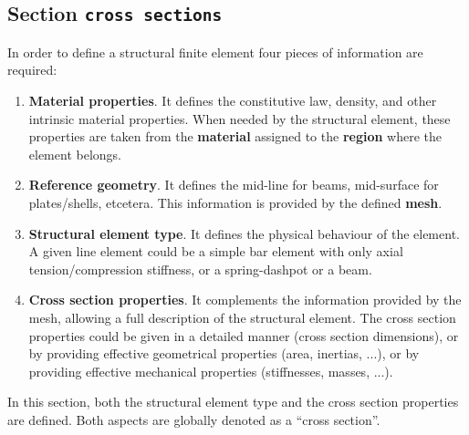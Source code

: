 \documentclass[a4paper,fleqn]{book}
\begin{document}
\subsection{Section \texttt{cross sections}}
\label{sec:cross_sections}
\label{subsec:cross_sections}

In order to define a structural finite element four pieces of information are required:
\begin{enumerate}

  \item \textbf{Material properties}. It defines the constitutive law, density, and other intrinsic material properties. When needed by the structural element, these properties are taken from the \textbf{material} assigned to the \textbf{region} where the element belongs.

  \item \textbf{Reference geometry}. It defines the mid-line for beams, mid-surface for plates/shells, etcetera. This information is provided by the defined \textbf{mesh}.
  
  \item \textbf{Structural element type}. It defines the physical behaviour of the element. A given line element could be a simple bar element with only axial tension/compression stiffness, or a spring-dashpot or a beam.
  
  \item \textbf{Cross section properties}. It complements the information provided by the mesh, allowing a full description of the structural element. The cross section properties could be given in a detailed manner (cross section dimensions), or by providing effective geometrical properties (area, inertias, ...), or by providing effective mechanical properties (stiffnesses, masses, ...).
  
\end{enumerate}
In this section, both the structural element type and the cross section properties are defined. Both aspects are globally denoted as a ``cross section''.
\end{document}
